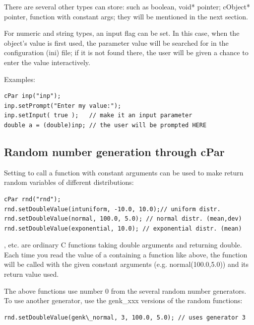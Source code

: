 There are several other types  can store: such as boolean,
void* pointer; cObject* pointer,  function with constant args;
they will be mentioned in the next section.

For numeric and string types, an input flag can be
set. In this case, when the object's value is first used, the
parameter value will be searched for in the configuration (ini)
file; if it is not found there, the user will be given
a chance to enter the value interactively.


Examples:

\begin{verbatim}
cPar inp("inp");
inp.setPrompt("Enter my value:");
inp.setInput( true );   // make it an input parameter
double a = (double)inp; // the user will be prompted HERE
\end{verbatim}




\subsection{Random number generation through cPar}

Setting  to call a function with constant arguments can
be used to make  return random variables of different distributions:

\begin{verbatim}
cPar rnd("rnd");
rnd.setDoubleValue(intuniform, -10.0, 10.0);// uniform distr.
rnd.setDoubleValue(normal, 100.0, 5.0); // normal distr. (mean,dev)
rnd.setDoubleValue(exponential, 10.0); // exponential distr. (mean)
\end{verbatim}

,  etc. are ordinary C functions
taking double arguments and returning double. Each time you read the
value of a  containing a function like above, the
function will be called with the given constant arguments (e.g.
normal(100.0,5.0)) and its return value used.


The above functions use number 0 from the several random number
generators. To use another generator, use the genk\_xxx versions
of the random functions:

\begin{verbatim}
rnd.setDoubleValue(genk\_normal, 3, 100.0, 5.0); // uses generator 3
\end{verbatim}

